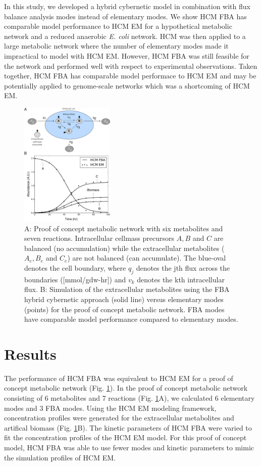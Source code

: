 \documentclass[10pt,twocolumn,twoside,final]{IEEEtran}
\begin{document}
In this study, we developed a hybrid cybernetic model in combination with flux balance analysis modes instead of elementary modes.
We show HCM FBA has comparable model performance to HCM EM for a hypothetical metabolic network and a reduced anaerobic \textit{E. coli} network.
HCM was then applied to a large metabolic network where the number of elementary modes made it impractical to model with HCM EM.
However, HCM FBA was still feasible for the network and performed well with respect to experimental observations.
Taken together, HCM FBA has comparable model performace to HCM EM and may be potentially applied to genome-scale networks which was a shortcoming of HCM EM.


\begin{figure}[!t]\centering
\includegraphics[width=0.40\textwidth]{./figs/Fig-1-GeneralModel-Results.pdf}
\caption{A: Proof of concept metabolic network with six metabolites and seven reactions.
Intracellular cellmass precursors $A,B$ and $C$ are balanced (no accumulation) while the extracellular metabolites ($A_{e},B_{e}$ and $C_{e}$) are not balanced (can accumulate). The blue-oval denotes the cell boundary, where $q_{j}$ denotes the jth flux across the boundaries ([mmol/gdw-hr]) and $v_{k}$ denotes the kth intracellular flux. B: Simulation of the extracellular metabolites using the FBA hybrid cybernetic approach (solid line) versus elementary modes (points) for the proof of concept metabolic network. FBA modes have comparable model performance compared to elementary modes.
}\label{fig:model-fitting}
\end{figure}

\section{Results}
The performance of HCM FBA was equivalent to HCM EM for a proof of concept metabolic network (Fig. \ref{fig:model-fitting}).
In the proof of concept metabolic network consisting of 6 metabolites and 7 reactions (Fig. \ref{fig:model-fitting}A), we calculated 6 elementary modes and 3 FBA modes.
Using the HCM EM modeling framework, concentration profiles were generated for the extracellular metabolites and artifical biomass (Fig. \ref {fig:model-fitting}B).
The kinetic parameters of HCM FBA were varied to fit the concentration profiles of the HCM EM model.
For this proof of concept model, HCM FBA was able to use fewer modes and kinetic parameters to mimic the simulation profiles of HCM EM.
\end{document}
